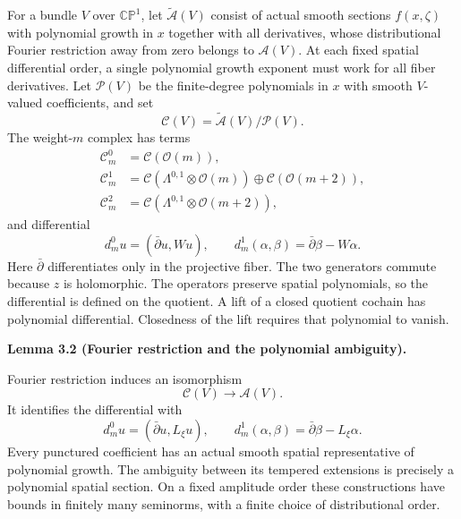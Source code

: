 \documentclass[
  english,
  11pt,
  reqno]{amsart}
\makeatletter
\newcommand{\pandocstatementheading}[1]{%
  \par\if@nobreak\else
    \addpenalty{\@beginparpenalty}%
    \addvspace{.5\baselineskip plus .2\baselineskip minus .2\baselineskip}%
  \fi
  {\normalfont\bfseries #1\par}%
  \nobreak\@afterindenttrue\@afterheading
}
\makeatother
\begin{document}
For a bundle \(V\) over \(\mathbb{CP}^1\), let
\(\widetilde{\mathscr A}(V)\) consist of actual smooth sections
\(f(x,\zeta)\) with polynomial growth in \(x\) together with all
derivatives, whose distributional Fourier restriction away from zero
belongs to \(\mathscr A(V)\). At each fixed spatial differential order,
a single polynomial growth exponent must work for all fiber derivatives.
Let \(\mathscr P(V)\) be the finite-degree polynomials in \(x\) with
smooth \(V\)-valued coefficients, and set%
 \[
\mathscr C(V)=\widetilde{\mathscr A}(V)/\mathscr P(V).
\] The weight-\(m\) complex has terms \[
\begin{aligned}
\mathscr C_m^0&=\mathscr C(\mathcal O(m)),\\
\mathscr C_m^1&=\mathscr C(\Lambda^{0,1}\otimes\mathcal O(m))
\oplus\mathscr C(\mathcal O(m+2)),\\
\mathscr C_m^2&=\mathscr C(\Lambda^{0,1}\otimes\mathcal O(m+2)),
\end{aligned}
\] and differential%
 \[
d_m^0u=(\bar\partial u,Wu),
\qquad
d_m^1(\alpha,\beta)=\bar\partial\beta-W\alpha.
\] Here \(\bar\partial\) differentiates only in the projective fiber.
The two generators commute because \(z\) is holomorphic. The operators
preserve spatial polynomials, so the differential is defined on the
quotient. A lift of a closed quotient cochain has polynomial
differential. Closedness of the lift requires that polynomial to vanish.

\pandocstatementheading{\leavevmode{}\label{lem:online-fourier-polynomial-quotient}Lemma 3.2 (Fourier restriction and the polynomial ambiguity).}

Fourier restriction induces an isomorphism%
 \[
\mathscr C(V)\longrightarrow\mathscr A(V).
\] It identifies the differential with%
 \[
d_m^0u=(\bar\partial u,L_\xi u),
\qquad
d_m^1(\alpha,\beta)=\bar\partial\beta-L_\xi\alpha.
\] Every punctured coefficient has an actual smooth spatial
representative of polynomial growth. The ambiguity between its tempered
extensions is precisely a polynomial spatial section. On a fixed
amplitude order these constructions have bounds in finitely many
seminorms, with a finite choice of distributional order.
\end{document}
